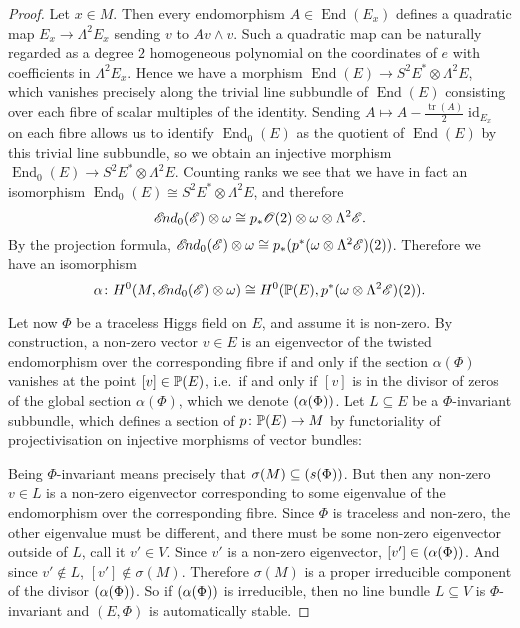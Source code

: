 \documentclass[A4paper, 12pt, british, reqno]{amsart}
\DeclareMathOperator{\End}{End}
\DeclareMathOperator{\id}{id}
\let\div\relax
\DeclareMathOperator{\div}{div}
\newcommand{\ot}{\otimes}
\newcommand{\dual}{^{*}}
\begin{document}
\begin{prop}
\begin{proof}
	Let $x\in M$.
	Then every endomorphism $A\in \End(E_{x})$ defines a quadratic map $E_{x}\to \Lambda^{2}E_{x}$ sending $v$ to $Av\wedge v$.
	Such a quadratic map can be naturally regarded as a degree $2$ homogeneous polynomial on the coordinates of $e$ with coefficients in $\Lambda^{2}E_{x}$.
	Hence we have a morphism $\End(E)\to S^{2}E\dual \ot \Lambda^{2}E$, which vanishes precisely along the trivial line subbundle of $\End(E)$ consisting over each fibre of scalar multiples of the identity.
	Sending $A\mapsto A-\frac{\operatorname{tr}(A)}{2}\id_{E_{x}}$ on each fibre allows us to identify $\End_{0}(E)$ as the quotient of $\End(E)$ by this trivial line subbundle, so we obtain an injective morphism $\End_{0}(E)\to S^{2}E\dual \ot \Lambda^{2}E$.
	Counting ranks we see that we have in fact an isomorphism $\End_{0}(E)\cong S^{2}E\dual \ot \Lambda^{2}E$, and therefore
	\[ \sEnd_{0}(\E)\ot \w\cong p_{*}\O(2)\ot \w\ot \Lambda^{2}\E. \]
	By the projection formula, $\sEnd_{0}(\E)\ot \w\cong p_{*}(p^{*}(\w\ot \Lambda^{2}\E)(2))$.
	Therefore we have an isomorphism
	\[ \alpha \colon H^{0}(M,\sEnd_{0}(\E)\ot \w)\cong H^{0}(\P(E),p^{*}(\w\ot \Lambda^{2}\E)(2)). \]

	Let now $\Phi$ be a traceless Higgs field on $E$, and assume it is non-zero.
	By construction, a non-zero vector $v\in E$ is an eigenvector of the twisted endomorphism over the corresponding fibre if and only if the section $\alpha(\Phi)$ vanishes at the point $[v]\in \P(E)$, i.e.~if and only if $[v]$ is in the divisor of zeros of the global section $\alpha(\Phi)$, which we denote $\div(\alpha(\Phi))$.
	Let $L\subseteq E$ be a $\Phi$-invariant subbundle, which defines a section of $p\colon \P(E)\to M$ by functoriality of projectivisation on injective morphisms of vector bundles:
	\begin{center}
	\end{center}
	Being $\Phi$-invariant means precisely that $\sigma(M)\subseteq \div(s(\Phi))$.
	But then any non-zero $v\in L$ is a non-zero eigenvector corresponding to some eigenvalue of the endomorphism over the corresponding fibre.
	Since $\Phi$ is traceless and non-zero, the other eigenvalue must be different, and there must be some non-zero eigenvector outside of $L$, call it $v'\in V$.
	Since $v'$ is a non-zero eigenvector, $[v']\in \div(\alpha(\Phi))$.
	And since $v'\not\in L$, $[v']\not\in \sigma(M)$.
	Therefore $\sigma(M)$ is a proper irreducible component of the divisor $\div(\alpha(\Phi))$.
	So if $\div(\alpha(\Phi))$ is irreducible, then no line bundle $L\subseteq V$ is $\Phi$-invariant and $(E,\Phi)$ is automatically stable.



\end{proof}
\end{prop}
\end{document}
